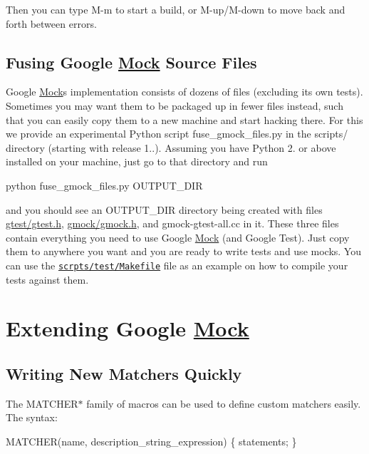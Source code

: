 Then you can type {\ttfamily M-\/m} to start a build, or {\ttfamily M-\/up}/{\ttfamily M-\/down} to move back and forth between errors.

\subsection*{Fusing Google \hyperlink{class_mock}{Mock} Source Files}

Google \hyperlink{class_mock}{Mock}\textquotesingle{}s implementation consists of dozens of files (excluding its own tests). Sometimes you may want them to be packaged up in fewer files instead, such that you can easily copy them to a new machine and start hacking there. For this we provide an experimental Python script {\ttfamily fuse\+\_\+gmock\+\_\+files.\+py} in the {\ttfamily scripts/} directory (starting with release 1..). Assuming you have Python 2. or above installed on your machine, just go to that directory and run 
\begin{DoxyCode}
python fuse\_gmock\_files.py OUTPUT\_DIR
\end{DoxyCode}


and you should see an {\ttfamily O\+U\+T\+P\+U\+T\+\_\+\+D\+IR} directory being created with files {\ttfamily \hyperlink{gtest_8h_source}{gtest/gtest.\+h}}, {\ttfamily \hyperlink{gmock_8h_source}{gmock/gmock.\+h}}, and {\ttfamily gmock-\/gtest-\/all.\+cc} in it. These three files contain everything you need to use Google \hyperlink{class_mock}{Mock} (and Google Test). Just copy them to anywhere you want and you are ready to write tests and use mocks. You can use the \href{http://code.google.com/p/googlemock/source/browse/trunk/scripts/test/Makefile}{\tt scrpts/test/\+Makefile} file as an example on how to compile your tests against them.

\section*{Extending Google \hyperlink{class_mock}{Mock}}

\subsection*{Writing New Matchers Quickly}

The {\ttfamily M\+A\+T\+C\+H\+E\+R$\ast$} family of macros can be used to define custom matchers easily. The syntax\+:


\begin{DoxyCode}
MATCHER(name, description\_string\_expression) \{ statements; \}
\end{DoxyCode}


